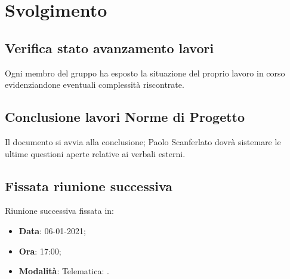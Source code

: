 \documentclass[]{article}
\begin{document}
	\newpage

	\section{Svolgimento}
		\subsection{Verifica stato avanzamento lavori}
		Ogni membro del gruppo ha esposto la situazione del proprio lavoro in corso evidenziandone eventuali complessità riscontrate.\\

		\subsection{Conclusione lavori Norme di Progetto}
		Il documento  si avvia alla conclusione; Paolo Scanferlato dovrà sistemare le ultime questioni aperte relative ai verbali esterni.\\

		\subsection{Fissata riunione successiva}
		Riunione successiva fissata in:
		\begin{itemize}
			\item \textbf{Data}: 06-01-2021;
			\item \textbf{Ora}: 17:00;
			\item \textbf{Modalità}: Telematica: .
		\end{itemize}
	
	\newpage
	
\end{document}
